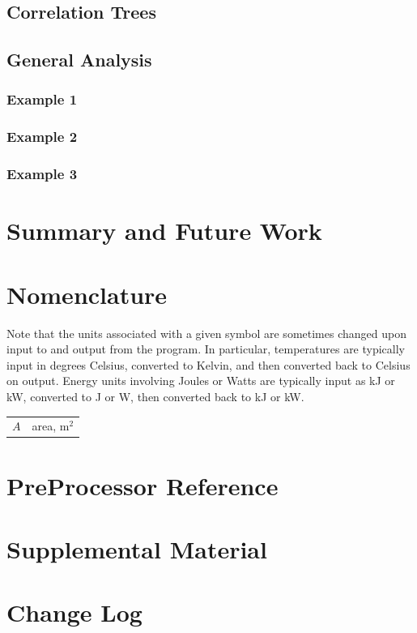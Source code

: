 \documentclass[12pt,twoside]{book}
\begin{document}
\section{Correlation Trees}

\section{General Analysis}

\subsection{Example 1}

\subsection{Example 2}

\subsection{Example 3}

%
%

\chapter{Summary and Future Work}



\appendix
{}

%
%

\chapter{Nomenclature}
\label{nomenclature}

Note that the units associated with a given symbol are sometimes changed upon input to and output from the program. In particular, temperatures are typically input in degrees Celsius, converted to Kelvin, and then converted back to Celsius on output. Energy units involving Joules or Watts are typically input as kJ or kW, converted to J or W, then converted back to kJ or kW.

\begin{center}
\begin{longtable}{p{1in}  p{5.5 in}}

$A$                 & area, m$^2$ \\
\end{longtable}

\end{center}

\chapter{PreProcessor Reference}
\label{preprocessor_reference}

\chapter{Supplemental Material}

\chapter{Change Log}

\label{last_page}
\end{document}
